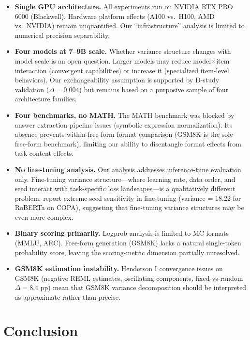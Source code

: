 \documentclass[11pt]{article}
\begin{document}
\begin{itemize}[topsep=2pt,itemsep=1pt]
  \item \textbf{Single GPU architecture.} All experiments run on NVIDIA RTX PRO 6000 (Blackwell). Hardware platform effects (A100 vs.\ H100, AMD vs.\ NVIDIA) remain unquantified. Our ``infrastructure'' analysis is limited to numerical precision separability.
  \item \textbf{Four models at 7--9B scale.} Whether variance structure changes with model scale is an open question. Larger models may reduce model$\times$item interaction (convergent capabilities) or increase it (specialized item-level behaviors). Our exchangeability assumption is supported by D-study validation ($\Delta = 0.004$) but remains based on a purposive sample of four architecture families.
  \item \textbf{Four benchmarks, no MATH.} The MATH benchmark was blocked by answer extraction pipeline issues (symbolic expression normalization). Its absence prevents within-free-form format comparison (GSM8K is the sole free-form benchmark), limiting our ability to disentangle format effects from task-content effects.
  \item \textbf{No fine-tuning analysis.} Our analysis addresses inference-time evaluation only. Fine-tuning variance structure---where learning rate, data order, and seed interact with task-specific loss landscapes---is a qualitatively different problem. \citet{bui2025} report extreme seed sensitivity in fine-tuning (variance = 18.22 for RoBERTa on COPA), suggesting that fine-tuning variance structures may be even more complex.
  \item \textbf{Binary scoring primarily.} Logprob analysis is limited to MC formats (MMLU, ARC). Free-form generation (GSM8K) lacks a natural single-token probability score, leaving the scoring-metric dimension partially unresolved.
  \item \textbf{GSM8K estimation instability.} Henderson I convergence issues on GSM8K (negative REML estimates, oscillating components, fixed-vs-random $\Delta = 8.4$ pp) mean that GSM8K variance decomposition should be interpreted as approximate rather than precise.
\end{itemize}

\section{Conclusion}
\end{document}
